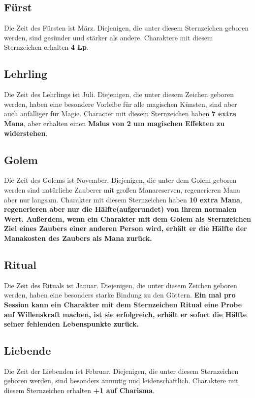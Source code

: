 \documentclass[../../Heldenanleitung2]{subfiles}
\begin{document}
\subsection{Fürst}
Die Zeit des Fürsten ist März. Diejenigen, die unter diesem Sternzeichen geboren werden, sind gesünder und stärker als andere. Charaktere mit diesem Sternzeichen erhalten \textbf{4 Lp}.

\subsection{Lehrling}
Die Zeit des Lehrlings ist Juli. Diejenigen, die unter diesem Zeichen geboren werden, haben eine besondere Vorleibe für alle magischen Künsten, sind aber auch anfälliger für Magie. Character mit diesem Sternzeichen haben \textbf{7 extra Mana}, aber erhalten einen \textbf{Malus von 2 um magischen Effekten zu widerstehen}.

\subsection{Golem}
Die Zeit des Golems ist November, Diejenigen, die unter dem Golem geboren werden sind natürliche Zauberer mit großen Manareserven, regenerieren Mana aber nur langsam. Charakter mit diesem Sternzeichen haben \textbf{10 extra Mana}, \textbf{regenerieren aber nur die Hälfte(aufgerundet) von ihrem normalen Wert. Außerdem, wenn ein Charakter mit dem Golem als Sternzeichen Ziel eines Zaubers einer anderen Person wird, erhält er die Hälfte der Manakosten des Zaubers als Mana zurück.}

\subsection{Ritual}
Die Zeit des Rituals ist Januar. Diejenigen, die unter diesem Zeichen geboren werden, haben eine besonders starke Bindung zu den Göttern. \textbf{Ein mal pro Session kann ein Charakter mit dem Sternzeichen Ritual eine Probe auf Willenskraft machen, ist sie erfolgreich, erhält er sofort die Hälfte seiner fehlenden Lebenspunkte zurück.}

\subsection{Liebende}
Die Zeit der Liebenden ist Februar. Diejenigen, die unter diesem Sternzeichen geboren werden, sind besonders anmutig und leidenschaftlich. Charaktere mit diesem Sternzeichen erhalten \textbf{+1 auf Charisma}.
\end{document}
